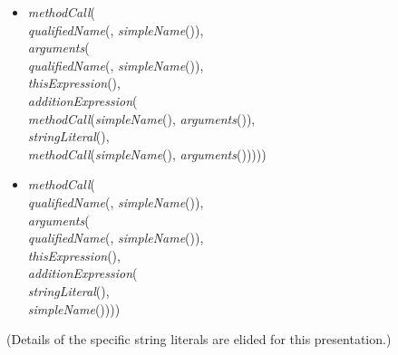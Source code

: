 \begin{itemize} [leftmargin=0.7in]
\item \textit{methodCall}(\\
\hspace*{1em}\textit{qualifiedName}(, \textit{simpleName}()),\\
\hspace*{1em}\textit{arguments}(\\
\hspace*{2em}\textit{qualifiedName}(, \mbox{\textit{simpleName}()}),\\
\hspace*{2em}\textit{thisExpression}(),\\
\hspace*{2em}\textit{additionExpression}(\\
\hspace*{3em}\textit{methodCall}(\textit{simpleName}(), \textit{arguments}()),\\
\hspace*{3em}\textit{stringLiteral}(),\\
\hspace*{3em}\textit{methodCall}(\textit{simpleName}(), \textit{arguments}()))))\\
\item \textit{methodCall}(\\
\hspace*{1em}\textit{qualifiedName}(, \textit{simpleName}()),\\
\hspace*{1em}\textit{arguments}(\\
\hspace*{2em}\textit{qualifiedName}(, \mbox{\textit{simpleName}()}),\\
\hspace*{2em}\textit{thisExpression}(),\\
\hspace*{2em}\textit{additionExpression}(\\
\hspace*{3em}\textit{stringLiteral}(),\\
\hspace*{3em}\textit{simpleName}())))\\
\end{itemize}
(Details of the specific string literals are elided for this presentation.)

